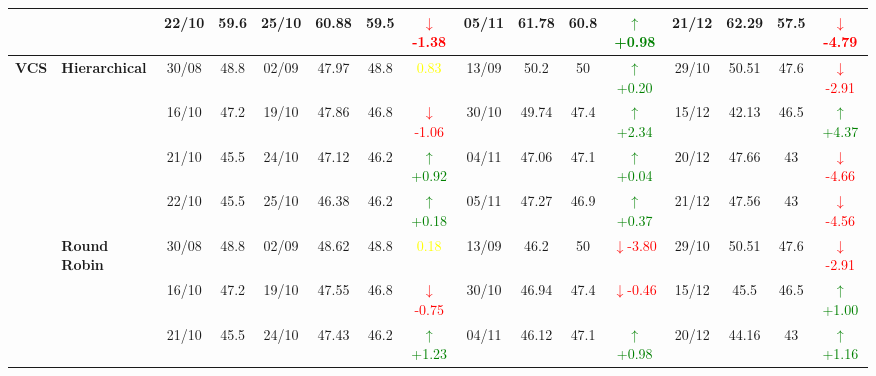 \documentclass{ieeeaccess}
\begin{document}
{\begin{longtable}{llcc|cccc|cccc|cccc}
&
& 22/10 & 59.6 & 25/10 & 60.88 & 59.5 & \textcolor{red}{\(\downarrow\)-1.38} & 05/11 & 61.78 & 60.8 & \textcolor{green}{\(\uparrow\)+0.98} & 21/12 & 62.29 & 57.5 & \textcolor{red}{\(\downarrow\)-4.79} \\
\midrule



\multirow{12}{*}{\textbf{VCS}} 
& \textbf{Hierarchical}
& 30/08 & 48.8 & 02/09 & 47.97 & 48.8 & \textcolor{yellow}{0.83} & 13/09 & 50.2 & 50 & \textcolor{green}{\(\uparrow\)+0.20} & 29/10 & 50.51 & 47.6 & \textcolor{red}{\(\downarrow\)-2.91} \\

&
& 16/10 & 47.2 & 19/10 & 47.86 & 46.8 & \textcolor{red}{\(\downarrow\)-1.06} & 30/10 & 49.74 & 47.4 & \textcolor{green}{\(\uparrow\)+2.34} & 15/12 & 42.13 & 46.5 & \textcolor{green}{\(\uparrow\)+4.37} \\

&
& 21/10 & 45.5 & 24/10 & 47.12 & 46.2 & \textcolor{green}{\(\uparrow\)+0.92} & 04/11 & 47.06 & 47.1 & \textcolor{green}{\(\uparrow\)+0.04} & 20/12 & 47.66 & 43 & \textcolor{red}{\(\downarrow\)-4.66} \\

&
& 22/10 & 45.5 & 25/10 & 46.38 & 46.2 & \textcolor{green}{\(\uparrow\)+0.18} & 05/11 & 47.27 & 46.9 & \textcolor{green}{\(\uparrow\)+0.37} & 21/12 & 47.56 & 43 & \textcolor{red}{\(\downarrow\)-4.56} \\
\cmidrule(lr){2-16}


& \textbf{Round Robin}
& 30/08 & 48.8 & 02/09 & 48.62 & 48.8 & \textcolor{yellow}{0.18} & 13/09 & 46.2 & 50 & \textcolor{red}{\(\downarrow\)-3.80} & 29/10 & 50.51 & 47.6 & \textcolor{red}{\(\downarrow\)-2.91} \\

&
& 16/10 & 47.2 & 19/10 & 47.55 & 46.8 & \textcolor{red}{\(\downarrow\)-0.75} & 30/10 & 46.94 & 47.4 & \textcolor{red}{\(\downarrow\)-0.46} & 15/12 & 45.5 & 46.5 & \textcolor{green}{\(\uparrow\)+1.00} \\

&
& 21/10 & 45.5 & 24/10 & 47.43 & 46.2 & \textcolor{green}{\(\uparrow\)+1.23} & 04/11 & 46.12 & 47.1 & \textcolor{green}{\(\uparrow\)+0.98} & 20/12 & 44.16 & 43 & \textcolor{green}{\(\uparrow\)+1.16} \\


\end{longtable}}
\end{document}
